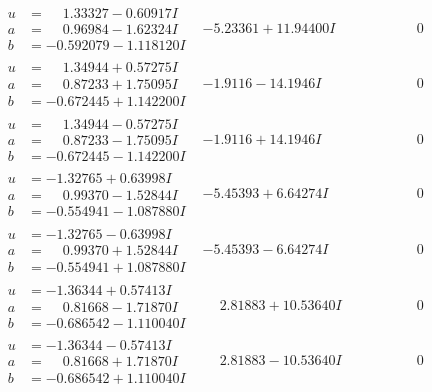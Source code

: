 \documentclass[1p]{elsarticle_modified}
\theoremstyle{definition}
\begin{document}
$$\begin{array}{c|c|c}
\begin{aligned}
u &= \phantom{-}1.33327 - 0.60917 I \\
a &= \phantom{-}0.96984 - 1.62324 I \\
b &= -0.592079 - 1.118120 I\end{aligned}
 & -5.23361 + 11.94400 I & \phantom{-0.000000 } 0 \\ \hline\begin{aligned}
u &= \phantom{-}1.34944 + 0.57275 I \\
a &= \phantom{-}0.87233 + 1.75095 I \\
b &= -0.672445 + 1.142200 I\end{aligned}
 & -1.9116 - 14.1946 I & \phantom{-0.000000 } 0 \\ \hline\begin{aligned}
u &= \phantom{-}1.34944 - 0.57275 I \\
a &= \phantom{-}0.87233 - 1.75095 I \\
b &= -0.672445 - 1.142200 I\end{aligned}
 & -1.9116 + 14.1946 I & \phantom{-0.000000 } 0 \\ \hline\begin{aligned}
u &= -1.32765 + 0.63998 I \\
a &= \phantom{-}0.99370 - 1.52844 I \\
b &= -0.554941 - 1.087880 I\end{aligned}
 & -5.45393 + 6.64274 I & \phantom{-0.000000 } 0 \\ \hline\begin{aligned}
u &= -1.32765 - 0.63998 I \\
a &= \phantom{-}0.99370 + 1.52844 I \\
b &= -0.554941 + 1.087880 I\end{aligned}
 & -5.45393 - 6.64274 I & \phantom{-0.000000 } 0 \\ \hline\begin{aligned}
u &= -1.36344 + 0.57413 I \\
a &= \phantom{-}0.81668 - 1.71870 I \\
b &= -0.686542 - 1.110040 I\end{aligned}
 & \phantom{-}2.81883 + 10.53640 I & \phantom{-0.000000 } 0 \\ \hline\begin{aligned}
u &= -1.36344 - 0.57413 I \\
a &= \phantom{-}0.81668 + 1.71870 I \\
b &= -0.686542 + 1.110040 I\end{aligned}
 & \phantom{-}2.81883 - 10.53640 I & \phantom{-0.000000 } 0 \\ \hline\begin{aligned}

\end{aligned}
\end{array}$$
\end{document}
